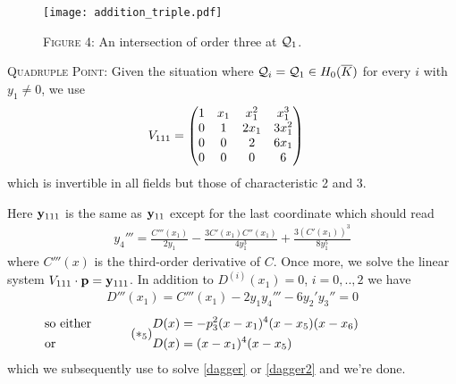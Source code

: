 \documentclass[english,11pt,a4paper]{article}
\begin{document}
\begin{figure}[ht]
  \fline
  \begin{center}
    \vspace{1mm}
    \texttt{[image: addition\_triple.pdf]}

    {\scshape Figure 4}: An intersection of order three at $\mathcal{Q}_1$.%
  \end{center}
  \vspace{-1.5mm}
  \fline
\end{figure}

\begin{case}
  {\scshape Quadruple Point:} Given the situation where $\mathcal{Q}_i = \mathcal{Q}_1 \in H_0(\overline K)$ for every $i$ with $y_1 \neq 0$, we use
  \begin{align*}V_{111} &=
    \begin{pmatrix}
      1 & x_1 & x_1^2 & x_1^3\\
      0 & 1 & 2 x_1 & 3 x_1^2\\
      0 & 0 & 2 & 6x_1\\
      0 & 0 & 0 & 6\\
    \end{pmatrix}
  \end{align*}
  which is invertible in all fields but those of characteristic 2 and 3.

  Here $\mathbf{y}_{111}$ is the same as $\mathbf{y}_{11}$ except for the last coordinate which should read
  \begin{align*}
    y_4''' = \frac{C'''(x_1)}{2y_1}-\frac{3C'(x_1)C''(x_1)}{4y_1^3}+\frac{3(C'(x_1))^3}{8y_1^5}
  \end{align*}
  where $C'''(x)$ is the third-order derivative of $C$. Once more, we solve the linear system $V_{111} \cdot \mathbf{p}=\mathbf{y}_{111}$. In addition to $D^{(i)}(x_1)=0$, $i=0,..,2$ we have
  \begin{align*}
    D'''(x_1) = C'''(x_1) - 2 y_1 y_4''' - 6 y_2' y_3'' = 0
  \end{align*}
  \vspace{-6mm}
  \begin{align} \tag{$*_5$} \begin{split}
    \rlap{\hspace{-31.5mm} so either} D(x) &= -p_3^2(x-x_1)^4(x-x_5)(x-x_6) \\
    \rlap{\hspace{-31.5mm} or}  D(x) &= (x-x_1)^4(x-x_5)
  \end{split} \end{align}
  which we subsequently use to solve \eqref{dagger} or \eqref{dagger2} and we're done.
\end{case}
\end{document}
